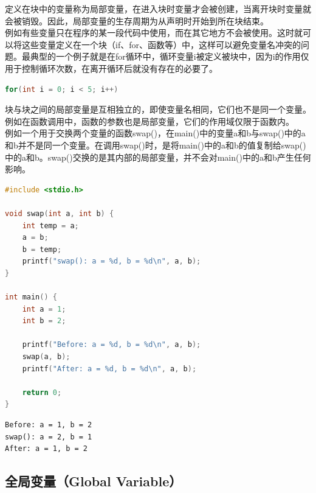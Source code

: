 定义在块中的变量称为局部变量，在进入块时变量才会被创建，当离开块时变量就会被销毁。因此，局部变量的生存周期为从声明时开始到所在块结束。\\

例如有些变量只在程序的某一段代码中使用，而在其它地方不会被使用。这时就可以将这些变量定义在一个块（if、for、函数等）中，这样可以避免变量名冲突的问题。最典型的一个例子就是在for循环中，循环变量i被定义被块中，因为i的作用仅用于控制循环次数，在离开循环后就没有存在的必要了。

\vspace{-0.5cm}

\begin{lstlisting}[language=C]
for(int i = 0; i < 5; i++)
\end{lstlisting}

块与块之间的局部变量是互相独立的，即使变量名相同，它们也不是同一个变量。\\

例如在函数调用中，函数的参数也是局部变量，它们的作用域仅限于函数内。\\

例如一个用于交换两个变量的函数swap()，在main()中的变量a和b与swap()中的a和b并不是同一个变量。在调用swap()时，是将main()中的a和b的值复制给swap()中的a和b。swap()交换的是其内部的局部变量，并不会对main()中的a和b产生任何影响。\\


\begin{lstlisting}[language=C]
#include <stdio.h>

void swap(int a, int b) {
	int temp = a;
	a = b;
	b = temp;
	printf("swap(): a = %d, b = %d\n", a, b);
}

int main() {
	int a = 1;
	int b = 2;

	printf("Before: a = %d, b = %d\n", a, b);
	swap(a, b);
	printf("After: a = %d, b = %d\n", a, b);

	return 0;
}
\end{lstlisting}

\begin{tcolorbox}
	\begin{verbatim}
Before: a = 1, b = 2
swap(): a = 2, b = 1
After: a = 1, b = 2
	\end{verbatim}
\end{tcolorbox}

\vspace{0.5cm}

\subsection{全局变量（Global Variable）}

